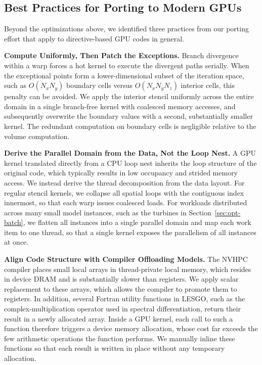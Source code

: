 \subsection{Best Practices for Porting to Modern GPUs}
\label{sec:opt-impl}

Beyond the optimizations above, we identified three practices from
our porting effort that apply to directive-based GPU codes in general.

\vspace{0.08in}
\noindent\textbf{Compute Uniformly, Then Patch the Exceptions.} Branch
divergence within a warp forces a hot kernel to execute the divergent
paths serially. When the exceptional points form a lower-dimensional
subset of the iteration space, such as $O(N_xN_y)$ boundary cells
versus $O(N_xN_yN_z)$ interior cells, this penalty can be avoided. We
apply the interior stencil uniformly across the entire domain in a
single branch-free kernel with coalesced memory accesses, and
subsequently overwrite the boundary values with a second, substantially
smaller kernel. The redundant computation on boundary cells is
negligible relative to the volume computation.

\vspace{0.08in}
\noindent\textbf{Derive the Parallel Domain from the Data, Not the Loop Nest.}
A GPU kernel translated directly from a CPU loop nest inherits the loop
structure of the original code, which typically results in low
occupancy and strided memory access. We instead derive the thread
decomposition from the data layout. For regular stencil kernels, we
collapse all spatial loops with the contiguous index innermost, so that
each warp issues coalesced loads. For workloads distributed across many
small model instances, such as the turbines in
Section~\ref{sec:opt-batch}, we flatten all
instances into a single parallel domain and map each work item to one
thread, so that a single kernel exposes the parallelism of all
instances at once.

\vspace{0.08in}
\noindent\textbf{Align Code Structure with Compiler Offloading Models.} The
NVHPC compiler places small local arrays in thread-private local
memory, which resides in device DRAM and is substantially slower than
registers. We apply scalar replacement to these arrays, which allows
the compiler to promote them to registers.
In addition, several Fortran utility functions in LESGO, such as the
complex-multiplication operator used in spectral differentiation,
return their result in a newly allocated array. Inside a GPU kernel,
each call to such a function therefore triggers a device memory
allocation, whose cost far exceeds the few arithmetic operations the
function performs. We manually inline these functions so that each
result is written in place without any temporary allocation.
